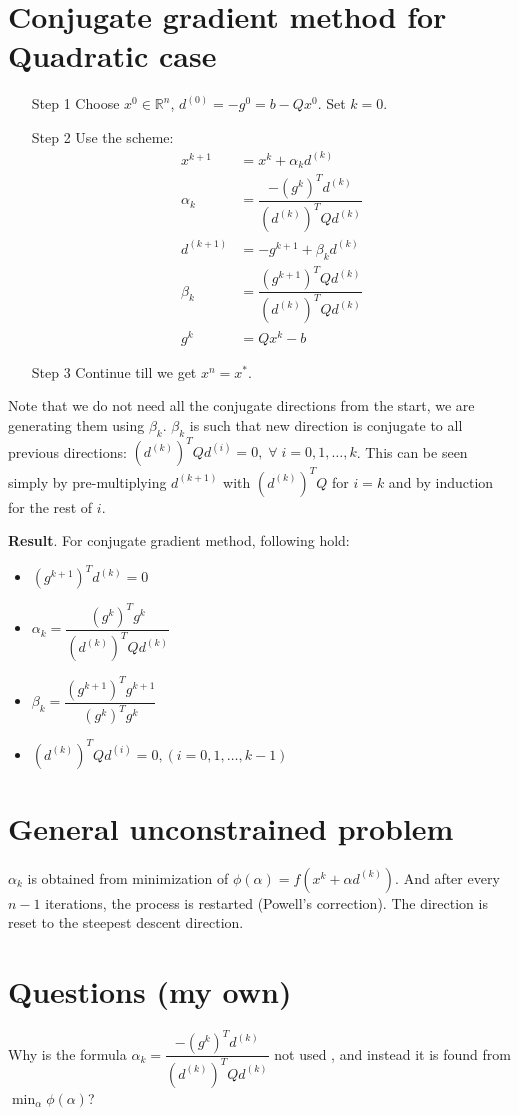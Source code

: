 \documentclass[11pt]{article}
\begin{document}
\section*{Conjugate gradient method for Quadratic case}
\begin{enumerate}
    \item[Step 1] Choose $x^0\in\mathbb{R}^n$, $d^{(0)}=-g^0=b-Qx^0$. Set $k=0$.
    \item[Step 2] Use the scheme:
        \begin{align*}
            x^{k+1}&=x^k+\alpha_kd^{(k)}\\
            \alpha_k&=\dfrac{-(g^k)^Td^{(k)}}{(d^{(k)})^TQd^{(k)}}\\
            d^{(k+1)}&=-g^{k+1}+\beta_kd^{(k)}\\
            \beta_k&=\dfrac{(g^{k+1})^TQd^{(k)}}{(d^{(k)})^TQd^{(k)}}\\
            g^k&=Qx^k-b
        \end{align*}
    \item[Step 3] Continue till we get $x^n=x^*$.
\end{enumerate}
Note that we do not need all the conjugate directions from the start, we are generating
them using $\beta_k$. $\beta_k$ is such that new direction is conjugate to all 
previous directions: $(d^{(k)})^TQd^{(i)}=0,\;\forall\;i=0,1,\dotsc,k$. This can
be seen simply by pre-multiplying $d^{(k+1)}$ with $(d^{(k)})^TQ$ for $i=k$ and
by induction for the rest of $i$.

\vskip0.5cm\noindent\textbf{Result}. For conjugate gradient method, following hold:
\begin{itemize}
    \item $(g^{k+1})^Td^{(k)}=0$\\
    \item $\alpha_k=\dfrac{(g^k)^Tg^k}{(d^{(k)})^TQd^{(k)}}$\\
    \item $\beta_k=\dfrac{(g^{k+1})^Tg^{k+1}}{(g^k)^Tg^k}$\\
    \item $(d^{(k)})^TQd^{(i)}=0, (i=0,1,\dotsc,k-1)$\\
\end{itemize}
%
%
\section*{General unconstrained problem}
$\alpha_k$ is obtained from minimization of $\phi(\alpha)=f(x^k+\alpha d^{(k)})$.
And after every $n-1$ iterations, the process is restarted (Powell's correction).
The direction is reset to the steepest descent direction.

\section*{Questions (my own)}
Why is the formula $\alpha_k=\dfrac{-(g^k)^Td^{(k)}}{(d^{(k)})^TQd^{(k)}}$ not used%
, and instead it is found from $\min_{\alpha}\phi(\alpha)$?
\end{document}
